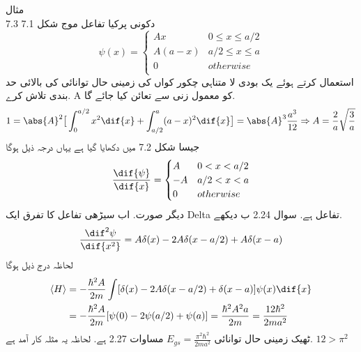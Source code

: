 مثال \\7.3
دکونی پرکیا تفاعل موج شکل 7.1
\[\psi(x)=\begin{cases}
Ax & 0\le x\le a/2\\
A(a-x) & a/2\le x\le a\\
0 & otherwise\\
\end{cases}\]
استعمال کرتے ہوئے یک بودی لا متناہی چکور كواں کی زمینی حال توانائی کی بالائی حد بندی تلاش کرے. A کو معمول زنی سے تعائن کیا جائے گا.
\[1=\abs{A}^{2}\big [\int_{0}^{a/2} x^{2}\dif{x}+\int_{a/2}^{a}(a-x)^{2}\dif{x} \big ]=\abs{A}^{3}\frac{a^{3}}{12}\Rightarrow A=\frac{2}{a}\sqrt{\frac{3}{a}}\]
جیسا شکل 7.2 میں دکھایا گیا ہے یہاں درجہ ذيل ہوگا
\[\frac{\dif{\psi}}{\dif{x}}=\begin{cases}
A & 0<x<a/2\\
-A & a/2<x<a\\
0& otherwise\\
\end{cases}\]
دیگر صورت. اب سیڑھی تفاعل کا تفرق ایک Delta تفاعل ہے. سوال 2.24 ب دیکھے.
\[\frac{\dif^{2}{\psi}}{\dif{x^{2}}}=A\delta(x)-2A\delta(x-a/2)+A\delta(x-a)\]
لحاظہ درج ذیل ہوگا 
\begin{align*}
\langle H \rangle &= -\frac{\hbar^{2}A}{2m}\int[\delta(x)-2A\delta(x-a/2)+\delta(x-a)]\psi(x)\dif{x}\\
&= -\frac{\hbar^{2}A}{2m}[\psi(0)-2\psi(a/2)+\psi(a)]=\frac{\hbar^{2}A^{2}a}{2m}=\frac{12\hbar^{2}}{2ma^{2}}\\
\end{align*}
ٹھیک زمینی حال توانائی
\(E_{gs}=\frac{\pi^{2}\hbar^{2}}{2ma^{2}}\)
مساوات 2.27 ہے. لحاظہ یہ مثلہ کار آمد ہے. 
\(12>\pi^{2}\)\\


